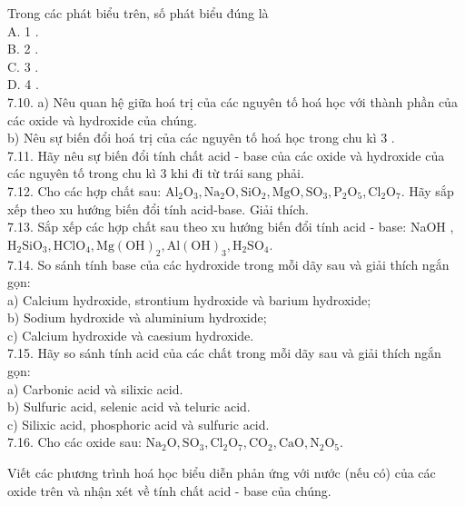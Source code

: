 \documentclass[10pt]{article}
\begin{document}
Trong các phát biểu trên, số phát biểu đúng là\\
A. 1 .\\
B. 2 .\\
C. 3 .\\
D. 4 .\\
7.10. a) Nêu quan hệ giữa hoá trị của các nguyên tố hoá học với thành phần của các oxide và hydroxide của chúng.\\
b) Nêu sự biến đổi hoá trị của các nguyên tố hoá học trong chu kì 3 .\\
7.11. Hãy nêu sự biến đổi tính chất acid - base của các oxide và hydroxide của các nguyên tố trong chu kì 3 khi đi từ trái sang phải.\\
7.12. Cho các hợp chất sau: $\mathrm{Al}_{2} \mathrm{O}_{3}, \mathrm{Na}_{2} \mathrm{O}, \mathrm{SiO}_{2}, \mathrm{MgO}, \mathrm{SO}_{3}, \mathrm{P}_{2} \mathrm{O}_{5}, \mathrm{Cl}_{2} \mathrm{O}_{7}$. Hãy sắp xếp theo xu hướng biến đổi tính acid-base. Giải thích.\\
7.13. Sắp xếp các hợp chất sau theo xu hướng biến đổi tính acid - base: NaOH , $\mathrm{H}_{2} \mathrm{SiO}_{3}, \mathrm{HClO}_{4}, \mathrm{Mg}(\mathrm{OH})_{2}, \mathrm{Al}(\mathrm{OH})_{3}, \mathrm{H}_{2} \mathrm{SO}_{4}$.\\
7.14. So sánh tính base của các hydroxide trong mỗi dãy sau và giải thích ngắn gọn:\\
a) Calcium hydroxide, strontium hydroxide và barium hydroxide;\\
b) Sodium hydroxide và aluminium hydroxide;\\
c) Calcium hydroxide và caesium hydroxide.\\
7.15. Hãy so sánh tính acid của các chất trong mỗi dãy sau và giải thích ngắn gọn:\\
a) Carbonic acid và silixic acid.\\
b) Sulfuric acid, selenic acid và teluric acid.\\
c) Silixic acid, phosphoric acid và sulfuric acid.\\
7.16. Cho các oxide sau: $\mathrm{Na}_{2} \mathrm{O}, \mathrm{SO}_{3}, \mathrm{Cl}_{2} \mathrm{O}_{7}, \mathrm{CO}_{2}, \mathrm{CaO}, \mathrm{N}_{2} \mathrm{O}_{5}$.

Viết các phương trình hoá học biểu diễn phản ứng với nước (nếu có) của các oxide trên và nhận xét về tính chất acid - base của chúng.
\end{document}
